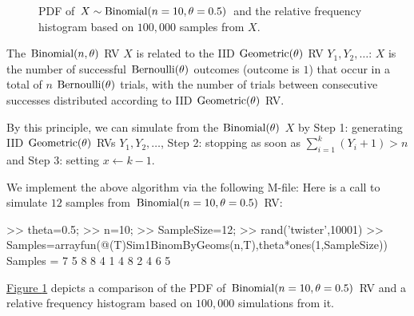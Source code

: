 \begin{figure}[htpb]
\caption{PDF of $X \sim \mbox{{\rm Binomial}}(n=10,\theta=0.5)$ and the relative frequency histogram based on $100,000$ samples from $X$.\label{F:PlotPdfSim10000HistBinomByGeomsn10thetaHalf}}
\centering   {}
\end{figure}

The $\mbox{{\rm Binomial}}(n,\theta)$ RV $X$ is related to the IID $\mbox{{\rm Geometric}}(\theta)$ RV $Y_1,Y_2,\ldots$: $X$ is the number of successful $\mbox{{\rm Bernoulli}}(\theta)$ outcomes (outcome is $1$) that occur in a total of $n$ $\mbox{{\rm Bernoulli}}(\theta)$ trials, with the number of trials between consecutive successes distributed according to IID $\mbox{{\rm Geometric}}(\theta)$ RV.
\begin{simulation}\label{SIM:BinomialFromGeoms}
By this principle, we can simulate from the $\mbox{{\rm Binomial}}(\theta)$ $X$ by {\sf Step 1}: generating IID $\mbox{{\rm Geometric}}(\theta)$ RVs $Y_1,Y_2,\ldots$, {\sf Step 2}: stopping as soon as $\sum_{i=1}^k (Y_i+1) > n$ and {\sf Step 3:} setting $x \gets k-1$.

We implement the above algorithm via the following M-file:
Here is a call to simulate $12$ samples from $\mbox{{\rm Binomial}}(n=10,\theta=0.5)$ RV:
\begin{VrbM}
>> theta=0.5; %
>> n=10; %
>> SampleSize=12;%
>> rand('twister',10001) %
>> Samples=arrayfun(@(T)Sim1BinomByGeoms(n,T),theta*ones(1,SampleSize))
Samples =     7     5     8     8     4     1     4     8     2     4     6     5
\end{VrbM}
\hyperref[F:PlotPdfSim10000HistBinomByGeomsn10thetaHalf]{Figure \ref*{F:PlotPdfSim10000HistBinomByGeomsn10thetaHalf}} depicts a comparison of the PDF of $\mbox{{\rm Binomial}}(n=10,\theta=0.5)$ RV and a relative frequency histogram based on $100,000$ simulations from it.
\end{simulation}

